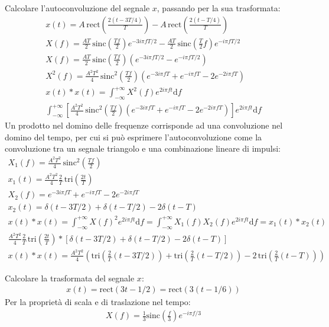 \documentclass{article}
\newcommand{\rect}{\mathrm{rect}}
\newcommand{\sinc}{\mathrm{sinc}}
\newcommand{\tri}{\mathrm{tri}}
\newcommand{\df}{\mathrm{d}}
\begin{document}
Calcolare l'autoconvoluzione del segnale $x$, passando per la sua trasformata: 
\begin{gather*}
    x(t)=A\,\rect\displaystyle\left(\frac{2(t-3T/4)}{T}\right)-A\,\rect\displaystyle\left(\frac{2(t-T/4)}{T}\right)\\
    X(f)=\displaystyle\frac{AT}{2}\,\sinc\left(\frac{Tf}{2}\right)e^{-3i\pi fT/2}-\displaystyle\frac{AT}{2}\,\sinc\left(\frac{T}{2}f\right)e^{-i\pi fT/2}\\
    X(f)=\displaystyle\frac{AT}{2}\,\sinc\left(\frac{Tf}{2}\right)\left(e^{-3i\pi fT/2}-e^{-i\pi fT/2}\right)\\
    X^2(f)=\displaystyle\frac{A^2T^2}{4}\,\sinc^2\left(\frac{Tf}{2}\right)\left(e^{-3i\pi fT}+e^{-i\pi fT}-2e^{-2i\pi fT}\right)\\
    x(t)*x(t)=\displaystyle\int_{-\infty}^{+\infty}X^2(f)e^{2i\pi ft}\df f\\
    \displaystyle\int_{-\infty}^{+\infty}\left[\frac{A^2T^2}{4}\,\sinc^2\left(\frac{Tf}{2}\right)\left(e^{-3i\pi fT}+e^{-i\pi fT}-2e^{-2i\pi fT}\right)\right]e^{2i\pi ft}\df f
\end{gather*}
Un prodotto nel domino delle frequenze corrisponde ad una convoluzione nel domino del tempo, per cui si può esprimere l'autoconvoluzione come la convoluzione tra un segnale 
triangolo e una combinazione lineare di impulsi:
\begin{gather*}
    X_1(f)=\displaystyle\frac{A^2T^2}{4}\,\sinc^2\left(\frac{Tf}{2}\right)\\
    x_1(t)=\displaystyle\frac{A^2T^2}{4}\frac{2}{T}\,\tri \left(\frac{2t}{T}\right)\\
    X_2(f)=e^{-3i\pi fT}+e^{-i\pi fT}-2e^{-2i\pi fT}\\
    x_2(t)=\delta(t-3T/2)+\delta(t-T/2)-2\delta(t-T)\\
    x(t)*x(t)=\displaystyle\int_{-\infty}^{+\infty}X(f)^2e^{2i\pi ft}\df f=\int_{-\infty}^{+\infty}X_1(f)X_2(f)e^{2i\pi ft}\df f=x_1(t)*x_2(t)\\
    \displaystyle\frac{A^2T^2}{4}\frac{2}{T}\,\tri \left(\frac{2t}{T}\right)*\left[\delta(t-3T/2)+\delta(t-T/2)-2\delta(t-T)\right]
\end{gather*}
\begin{gather}
    x(t)*x(t)=\displaystyle\frac{A^2T^2}{4}\left(\tri \left(\frac{2}{T}(t-3T/2)\right)+\tri \left(\frac{2}{T}(t-T/2)\right)-2\,\tri \left(\frac{2}{T}(t-T)\right)\right)
\end{gather}

Calcolare la trasformata del segnale $x$: 
\begin{gather*}
    x(t)=\rect(3t-1/2)=\rect(3(t-1/6))
\end{gather*}
Per la proprietà di scala e di traslazione nel tempo:
\begin{gather}
    X(f)=\displaystyle\frac{1}{3}\sinc\left(\frac{f}{3}\right)e^{-i\pi f/3}
\end{gather}
\end{document}
